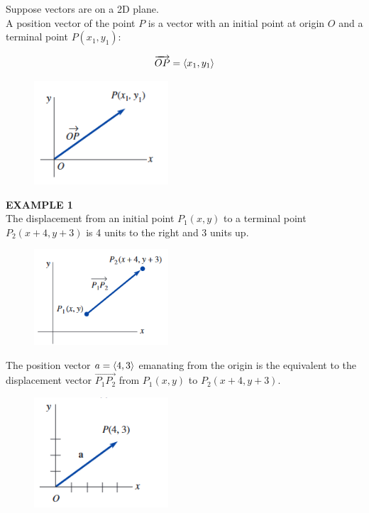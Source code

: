 \documentclass{article}
\DeclareRobustCommand{\qdist}[1]{\ifmmode\langle#1\rangle\else\textlangle#1\textrangle\fi}
\begin{document}
Suppose vectors are on a 2D plane.\\

A position vector of the point \(P\) is a vector with an initial point at origin \(O\) and a terminal point \(P(x_1 , y_1)\):

\[\overrightarrow{OP} = \qdist{x_1,y_1}\]

\begin{figure}[h]
  \includegraphics[width=5cm]{images/figure5.PNG}
  \centering
\end{figure}

\textbf{EXAMPLE 1}\\

The displacement from an initial point \(P_1(x,y)\) to a terminal point \(P_2(x + 4, y + 3)\)
is 4 units to the right and 3 units up.

\begin{figure}[h]
  \includegraphics[width=5cm]{images/figure6.PNG}
  \centering
\end{figure}

The position vector \(a = \qdist{4,3}\) emanating from the origin is the equivalent to the displacement vector \(\overrightarrow{P_1 P_2}\) from \(P_1(x,y)\) to \(P_2(x+4,y+3)\).

\begin{figure}[H]
  \includegraphics[width=5cm]{images/figure7.PNG}
  \centering
\end{figure}\vspace{0.5cm}
\end{document}
